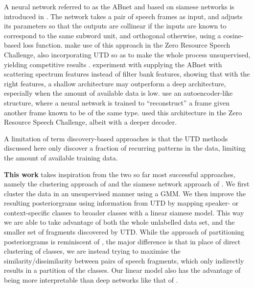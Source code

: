 A neural network referred to as the ABnet and based on siamese networks \parencite{bromley1994signature} is introduced in \parencite{synnaeve2014phonetics}.
The network takes a pair of speech frames as input, and adjusts its parameters so that the outputs are collinear if the inputs are known to correspond to the same subword unit, and orthogonal otherwise, using a cosine-based loss function.
\textcite{thiolliere2015hybrid} make use of this approach in the Zero Resource Speech Challenge, also incorporating UTD so as to make the whole process unsupervised, yielding competitive results \parencite{versteegh2016zero}.
\textcite{zeghidour2016deep} experiment with supplying the ABnet with scattering spectrum features instead of filter bank features, showing that with the right features, a shallow architecture may outperform a deep architecture, especially when the amount of available data is low.
\textcite{kamper2015unsupervised} use an autoencoder-like structure, where a neural network is trained to ``reconstruct'' a frame given another frame known to be of the same type.
\textcite{renshaw2015comparison} used this architecture in the Zero Resource Speech Challenge, albeit with a deeper decoder.

A limitation of term discovery-based approaches is that the UTD methods discussed here only discover a fraction of recurring patterns in the data, limiting the amount of available training data.

\textbf{This work} %
takes inspiration from the two so far most successful approaches, namely the clustering approach of \parencite{chen2015parallel} and the siamese network approach of \parencite{thiolliere2015hybrid}.
We first cluster the data in an unsupervised manner using a GMM.
We then improve the resulting posteriorgrams using information from UTD by mapping speaker- or context-specific classes to broader classes with a linear siamese model.
This way we are able to take advantage of both the whole unlabelled data set, and the smaller set of fragments discovered by UTD.
While the approach of partitioning posteriorgrams is reminiscent of \parencite{jansen2013weak}, the major difference is that in place of direct clustering of classes, we are instead trying to maximise the similarity/dissimilarity between pairs of speech fragments, which only indirectly results in a partition of the classes.
Our linear model also has the advantage of being more interpretable than deep networks like that of \parencite{thiolliere2015hybrid}.


